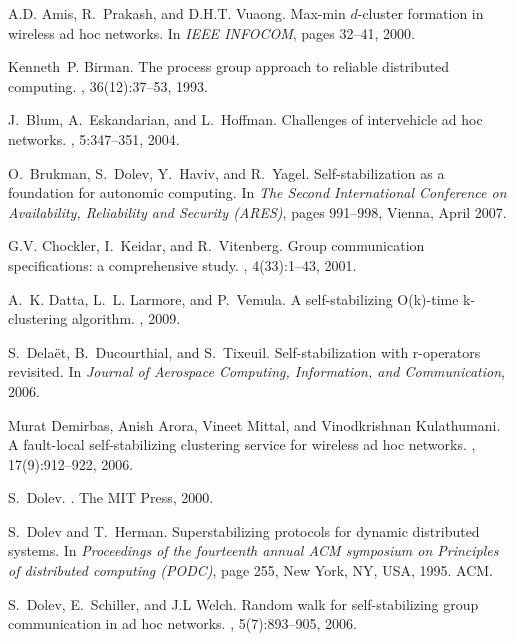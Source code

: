 \documentclass[11pt,english]{article}
\begin{document}
\begin{thebibliography}{10}

A.D. Amis, R.~Prakash, and D.H.T. Vuaong.
\newblock Max-min $d$-cluster formation in wireless ad hoc networks.
\newblock In {\em IEEE INFOCOM}, pages 32--41, 2000.

Kenneth~P. Birman.
\newblock The process group approach to reliable distributed computing.
, 36(12):37--53, 1993.

J.~Blum, A.~Eskandarian, and L.~Hoffman.
\newblock Challenges of intervehicle ad hoc networks.
,
  5:347--351, 2004.

O.~Brukman, S.~Dolev, Y.~Haviv, and R.~Yagel.
\newblock Self-stabilization as a foundation for autonomic computing.
\newblock In {\em The Second International Conference on Availability,
  Reliability and Security ({ARES})}, pages 991--998, Vienna, April 2007.

G.V. Chockler, I.~Keidar, and R.~Vitenberg.
\newblock Group communication specifications: a comprehensive study.
, 4(33):1--43, 2001.

A.~K. Datta, L.~L. Larmore, and P.~Vemula.
\newblock A self-stabilizing {O(k)}-time k-clustering algorithm.
, 2009.

S.~Dela{\"e}t, B.~Ducourthial, and S.~Tixeuil.
\newblock Self-stabilization with r-operators revisited.
\newblock In {\em Journal of Aerospace Computing, Information, and
  Communication}, 2006.

Murat Demirbas, Anish Arora, Vineet Mittal, and Vinodkrishnan Kulathumani.
\newblock A fault-local self-stabilizing clustering service for wireless ad hoc
  networks.
, 17(9):912--922, 2006.

S.~Dolev.
.
\newblock The MIT Press, 2000.

S.~Dolev and T.~Herman.
\newblock Superstabilizing protocols for dynamic distributed systems.
\newblock In {\em Proceedings of the fourteenth annual ACM symposium on
  Principles of distributed computing (PODC)}, page 255, New York, NY, USA,
  1995. ACM.

S.~Dolev, E.~Schiller, and J.L Welch.
\newblock Random walk for self-stabilizing group communication in ad hoc
  networks.
, 5(7):893--905, 2006.


\end{thebibliography}
\end{document}
